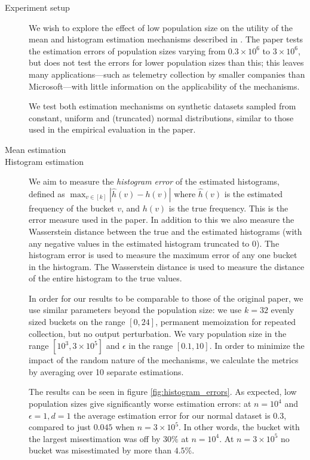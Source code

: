\documentclass[12pt]{article}
\begin{document}
\begin{description}
    \item[Experiment setup] We wish to explore the effect of low population size on the utility of the mean and histogram estimation mechanisms described in \cite{microsoft_telemetry}. The paper tests the estimation errors of population sizes varying from $0.3\times10^6$ to $3\times10^6$, but does not test the errors for lower population sizes than this; this leaves many applications---such as telemetry collection by smaller companies than Microsoft---with little information on the applicability of the mechanisms.
    
    We test both estimation mechanisms on synthetic datasets sampled from constant, uniform and (truncated) normal distributions, similar to those used in the empirical evaluation in the paper.
    
    \item[Mean estimation]
    
    \item[Histogram estimation]
    We aim to measure the \emph{histogram error} of the estimated histograms, defined as $\max_{v\in[k]} |\hat{h}(v)-h(v)|$ where $\hat{h}(v)$ is the estimated frequency of the bucket $v$, and $h(v)$ is the true frequency. This is the error measure used in the paper. In addition to this we also measure the Wasserstein distance between the true and the estimated histograms (with any negative values in the estimated histogram truncated to 0). The histogram error is used to measure the maximum error of any one bucket in the histogram. The Wasserstein distance is used to measure the distance of the entire histogram to the true values.
    
    In order for our results to be comparable to those of the original paper, we use similar parameters beyond the population size: we use $k=32$ evenly sized buckets on the range $[0,24]$, permanent memoization for repeated collection, but no output perturbation. We vary population size in the range $[10^3, 3\times10^5]$ and $\epsilon$ in the range $[0.1, 10]$. In order to minimize the impact of the random nature of the mechanisms, we calculate the metrics by averaging over 10 separate estimations.
    
    The results can be seen in figure \ref{fig:histogram_errors}. As expected, low population sizes give significantly worse estimation errors: at $n=10^4$ and $\epsilon=1, d=1$ the average estimation error for our normal dataset is $0.3$, compared to just $0.045$ when $n=3\times10^5$. In other words, the bucket with the largest misestimation was off by $30\%$ at $n=10^4$. At $n=3\times10^5$ no bucket was misestimated by more than $4.5\%$.
    

\end{description}
\end{document}
